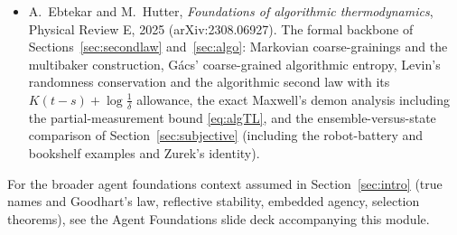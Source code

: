 \documentclass[10pt]{article}
\theoremstyle{definition}
\theoremstyle{remark}
\begin{document}
\begin{itemize}[leftmargin=2em]
  \item A.~Ebtekar and M.~Hutter, \emph{Foundations of algorithmic thermodynamics}, Physical Review E, 2025 (arXiv:2308.06927). The formal backbone of Sections~\ref{sec:secondlaw} and~\ref{sec:algo}: Markovian coarse-grainings and the multibaker construction, G\'acs' coarse-grained algorithmic entropy, Levin's randomness conservation and the algorithmic second law with its $K(t-s) + \log\frac1\delta$ allowance, the exact Maxwell's demon analysis including the partial-measurement bound \eqref{eq:algTL}, and the ensemble-versus-state comparison of Section~\ref{sec:subjective} (including the robot-battery and bookshelf examples and Zurek's identity).
\end{itemize}

For the broader agent foundations context assumed in Section~\ref{sec:intro} (true names and Goodhart's law, reflective stability, embedded agency, selection theorems), see the Agent Foundations slide deck accompanying this module.
\end{document}
